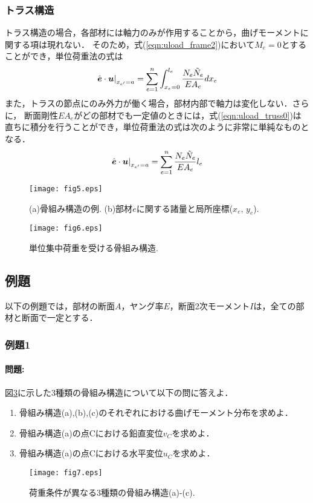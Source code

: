 \documentclass[10pt,a4j]{jarticle}
\begin{document}
\subsubsection{トラス構造}
トラス構造の場合，各部材には軸力のみが作用することから，曲げモーメントに関する項は現れない．
そのため，式(\ref{eqn:uload_frame2})において$M_e=0$とすることができ，単位荷重法の式は
\begin{equation}
	\left.
	\hat{\mbox{\boldmath $e$}}\cdot \mbox{\boldmath $u$}
	\right|_{x_{e'}=a}
	=
	\sum_{e=1}^n 
	\int_{x_e=0}^{l_e} 
	\frac{N_e \tilde N_e}{EA_e}
	dx_e
	\label{eqn:uload_truss0}
\end{equation}
また，トラスの節点にのみ外力が働く場合，部材内部で軸力は変化しない．さらに，
断面剛性$EA_e$がどの部材でも一定値のときには，式(\ref{eqn:uload_truss0})は
直ちに積分を行うことができ，単位荷重法の式は次のように非常に単純なものとなる．
\begin{equation}
	\left.
	\hat{\mbox{\boldmath $e$}}\cdot \mbox{\boldmath $u$}
	\right|_{x_{e'}=a}
	=
	\sum_{e=1}^n 
	\frac{N_e \tilde N_e}{EA_e}l_e
\end{equation}
\begin{figure}[h]
	\begin{center}
	\texttt{[image: fig5.eps]} 
	\end{center}
	\caption{(a)骨組み構造の例. 
	 (b)部材$e$に関する諸量と局所座標($x_e,\,y_e$).} 
	\label{fig:fig5}
\end{figure}
\begin{figure}
	\begin{center}
	\texttt{[image: fig6.eps]} 
	\end{center}
	\caption{単位集中荷重を受ける骨組み構造.} 
	\label{fig:fig6}
\end{figure}
\subsection{例題}
以下の例題では，部材の断面$A$，ヤング率$E$，断面2次モーメント$I$は，全ての部材と断面で一定とする．
\subsubsection{例題1}
\paragraph{問題:}
図\ref{fig:fig7}に示した3種類の骨組み構造について以下の問に答えよ．
\begin{enumerate}
\item
	骨組み構造(a),(b),(c)のそれぞれにおける曲げモーメント分布を求めよ．
\item
	骨組み構造(a)の点Cにおける鉛直変位$v_C$を求めよ．
\item
	骨組み構造(a)の点Cにおける水平変位$u_C$を求めよ．
\end{enumerate}
\begin{figure}
	\begin{center}
	\texttt{[image: fig7.eps]} 
	\end{center}
	\caption{荷重条件が異なる3種類の骨組み構造(a)-(c).}
	\label{fig:fig7}
\end{figure}
\end{document}
